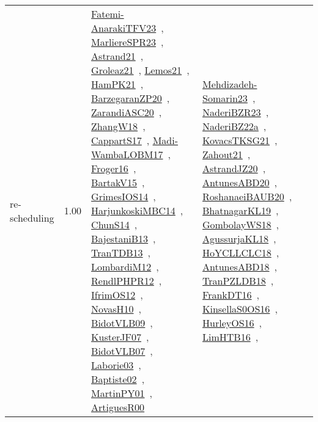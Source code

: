 {\begin{longtable}{p{3cm}r>{\raggedright\arraybackslash}p{6cm}>{\raggedright\arraybackslash}p{6cm}>{\raggedright\arraybackslash}p{8cm}}
\index{re-scheduling}\index{Concepts!re-scheduling}re-scheduling &  1.00 & \href{../works/Fatemi-AnarakiTFV23.pdf}{Fatemi-AnarakiTFV23}~\cite{Fatemi-AnarakiTFV23}, \href{../works/MarliereSPR23.pdf}{MarliereSPR23}~\cite{MarliereSPR23}, \href{../works/Astrand21.pdf}{Astrand21}~\cite{Astrand21}, \href{../works/Groleaz21.pdf}{Groleaz21}~\cite{Groleaz21}, \href{../works/Lemos21.pdf}{Lemos21}~\cite{Lemos21}, \href{../works/HamPK21.pdf}{HamPK21}~\cite{HamPK21}, \href{../works/BarzegaranZP20.pdf}{BarzegaranZP20}~\cite{BarzegaranZP20}, \href{../works/ZarandiASC20.pdf}{ZarandiASC20}~\cite{ZarandiASC20}, \href{../works/ZhangW18.pdf}{ZhangW18}~\cite{ZhangW18}, \href{../works/CappartS17.pdf}{CappartS17}~\cite{CappartS17}, \href{../works/Madi-WambaLOBM17.pdf}{Madi-WambaLOBM17}~\cite{Madi-WambaLOBM17}, \href{../works/Froger16.pdf}{Froger16}~\cite{Froger16}, \href{../works/BartakV15.pdf}{BartakV15}~\cite{BartakV15}, \href{../works/GrimesIOS14.pdf}{GrimesIOS14}~\cite{GrimesIOS14}, \href{../works/HarjunkoskiMBC14.pdf}{HarjunkoskiMBC14}~\cite{HarjunkoskiMBC14}, \href{../works/ChunS14.pdf}{ChunS14}~\cite{ChunS14}, \href{../works/BajestaniB13.pdf}{BajestaniB13}~\cite{BajestaniB13}, \href{../works/TranTDB13.pdf}{TranTDB13}~\cite{TranTDB13}, \href{../works/LombardiM12.pdf}{LombardiM12}~\cite{LombardiM12}, \href{../works/RendlPHPR12.pdf}{RendlPHPR12}~\cite{RendlPHPR12}, \href{../works/IfrimOS12.pdf}{IfrimOS12}~\cite{IfrimOS12}, \href{../works/NovasH10.pdf}{NovasH10}~\cite{NovasH10}, \href{../works/BidotVLB09.pdf}{BidotVLB09}~\cite{BidotVLB09}, \href{../works/KusterJF07.pdf}{KusterJF07}~\cite{KusterJF07}, \href{../works/BidotVLB07.pdf}{BidotVLB07}~\cite{BidotVLB07}, \href{../works/Laborie03.pdf}{Laborie03}~\cite{Laborie03}, \href{../works/Baptiste02.pdf}{Baptiste02}~\cite{Baptiste02}, \href{../works/MartinPY01.pdf}{MartinPY01}~\cite{MartinPY01}, \href{../works/ArtiguesR00.pdf}{ArtiguesR00}~\cite{ArtiguesR00} & \href{../works/Mehdizadeh-Somarin23.pdf}{Mehdizadeh-Somarin23}~\cite{Mehdizadeh-Somarin23}, \href{../works/NaderiBZR23.pdf}{NaderiBZR23}~\cite{NaderiBZR23}, \href{../works/NaderiBZ22a.pdf}{NaderiBZ22a}~\cite{NaderiBZ22a}, \href{../works/KovacsTKSG21.pdf}{KovacsTKSG21}~\cite{KovacsTKSG21}, \href{../works/Zahout21.pdf}{Zahout21}~\cite{Zahout21}, \href{../works/AstrandJZ20.pdf}{AstrandJZ20}~\cite{AstrandJZ20}, \href{../works/AntunesABD20.pdf}{AntunesABD20}~\cite{AntunesABD20}, \href{../works/RoshanaeiBAUB20.pdf}{RoshanaeiBAUB20}~\cite{RoshanaeiBAUB20}, \href{../works/BhatnagarKL19.pdf}{BhatnagarKL19}~\cite{BhatnagarKL19}, \href{../works/GombolayWS18.pdf}{GombolayWS18}~\cite{GombolayWS18}, \href{../works/AgussurjaKL18.pdf}{AgussurjaKL18}~\cite{AgussurjaKL18}, \href{../works/HoYCLLCLC18.pdf}{HoYCLLCLC18}~\cite{HoYCLLCLC18}, \href{../works/AntunesABD18.pdf}{AntunesABD18}~\cite{AntunesABD18}, \href{../works/TranPZLDB18.pdf}{TranPZLDB18}~\cite{TranPZLDB18}, \href{../works/FrankDT16.pdf}{FrankDT16}~\cite{FrankDT16}, \href{../works/KinsellaS0OS16.pdf}{KinsellaS0OS16}~\cite{KinsellaS0OS16}, \href{../works/HurleyOS16.pdf}{HurleyOS16}~\cite{HurleyOS16}, \href{../works/LimHTB16.pdf}{LimHTB16}~\cite{LimHTB16}, 
\end{longtable}}
